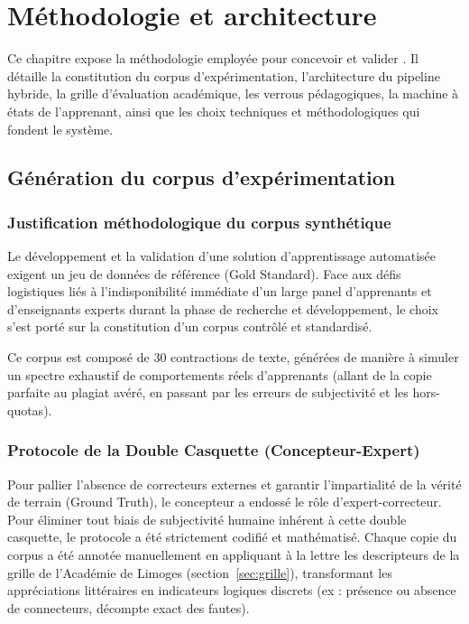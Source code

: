 \chapter{Méthodologie et architecture}
\label{ch:methodo}

Ce chapitre expose la méthodologie employée pour concevoir et valider \AZIZA. Il détaille la constitution du corpus d'expérimentation, l'architecture du pipeline hybride, la grille d'évaluation académique, les verrous pédagogiques, la machine à états de l'apprenant, ainsi que les choix techniques et méthodologiques qui fondent le système.

\section{Génération du corpus d'expérimentation}
\label{sec:generation-corpus}

\subsection{Justification méthodologique du corpus synthétique}

Le développement et la validation d'une solution d'apprentissage automatisée exigent un jeu de données de référence (Gold Standard). Face aux défis logistiques liés à l'indisponibilité immédiate d'un large panel d'apprenants et d'enseignants experts durant la phase de recherche et développement, le choix s'est porté sur la constitution d'un corpus contrôlé et standardisé.

Ce corpus est composé de 30 contractions de texte, générées de manière à simuler un spectre exhaustif de comportements réels d'apprenants (allant de la copie parfaite au plagiat avéré, en passant par les erreurs de subjectivité et les hors-quotas).

\subsection{Protocole de la \guillemotleft{}Double Casquette\guillemotright{} (Concepteur-Expert)}

Pour pallier l'absence de correcteurs externes et garantir l'impartialité de la vérité de terrain (Ground Truth), le concepteur a endossé le rôle d'expert-correcteur. Pour éliminer tout biais de subjectivité humaine inhérent à cette double casquette, le protocole a été strictement codifié et mathématisé. Chaque copie du corpus a été annotée manuellement en appliquant à la lettre les descripteurs de la grille de l'Académie de Limoges (section~\ref{sec:grille}), transformant les appréciations littéraires en indicateurs logiques discrets (ex : présence ou absence de connecteurs, décompte exact des fautes).


